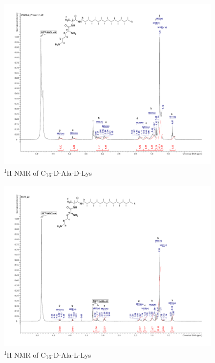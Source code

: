 \begin{figure}[ht!]
\centering
\includegraphics[scale=0.47]{NMR/KAT1_35.pdf}
\caption{\textsuperscript{1}H NMR of C\textsubscript{16}-D-Ala-D-Lys}
\label{KAT1.35_NMR}
\end{figure}

\begin{figure}[ht!]
\centering
\includegraphics[scale=0.47]{NMR/KAT1_22.pdf}
\caption{\textsuperscript{1}H NMR of C\textsubscript{16}-D-Ala-L-Lys}
\label{KAT1.22_NMR}
\end{figure}

